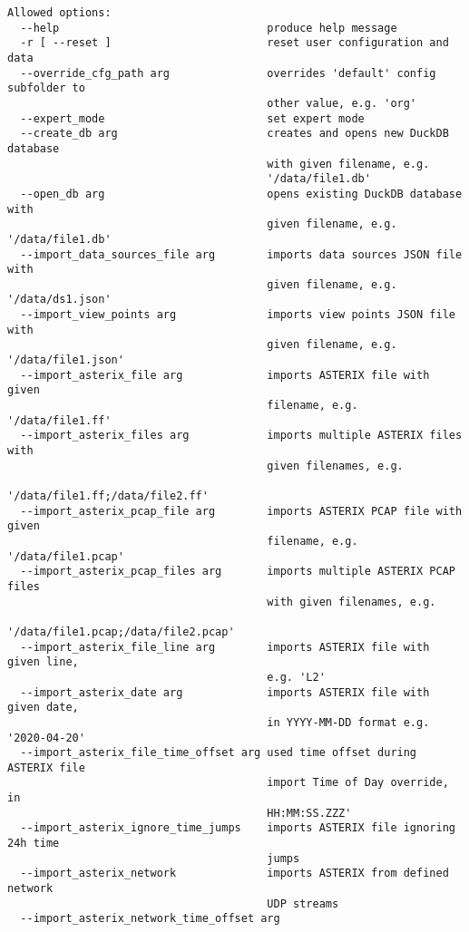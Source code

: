 \begin{lstlisting}
Allowed options:
  --help                                produce help message
  -r [ --reset ]                        reset user configuration and data
  --override_cfg_path arg               overrides 'default' config subfolder to
                                        other value, e.g. 'org'
  --expert_mode                         set expert mode
  --create_db arg                       creates and opens new DuckDB database 
                                        with given filename, e.g. 
                                        '/data/file1.db'
  --open_db arg                         opens existing DuckDB database with 
                                        given filename, e.g. '/data/file1.db'
  --import_data_sources_file arg        imports data sources JSON file with 
                                        given filename, e.g. '/data/ds1.json'
  --import_view_points arg              imports view points JSON file with 
                                        given filename, e.g. '/data/file1.json'
  --import_asterix_file arg             imports ASTERIX file with given 
                                        filename, e.g. '/data/file1.ff'
  --import_asterix_files arg            imports multiple ASTERIX files with 
                                        given filenames, e.g. 
                                        '/data/file1.ff;/data/file2.ff'
  --import_asterix_pcap_file arg        imports ASTERIX PCAP file with given 
                                        filename, e.g. '/data/file1.pcap'
  --import_asterix_pcap_files arg       imports multiple ASTERIX PCAP files 
                                        with given filenames, e.g. 
                                        '/data/file1.pcap;/data/file2.pcap'
  --import_asterix_file_line arg        imports ASTERIX file with given line, 
                                        e.g. 'L2'
  --import_asterix_date arg             imports ASTERIX file with given date, 
                                        in YYYY-MM-DD format e.g. '2020-04-20'
  --import_asterix_file_time_offset arg used time offset during ASTERIX file 
                                        import Time of Day override, in 
                                        HH:MM:SS.ZZZ'
  --import_asterix_ignore_time_jumps    imports ASTERIX file ignoring 24h time 
                                        jumps
  --import_asterix_network              imports ASTERIX from defined network 
                                        UDP streams
  --import_asterix_network_time_offset arg

\end{lstlisting}
